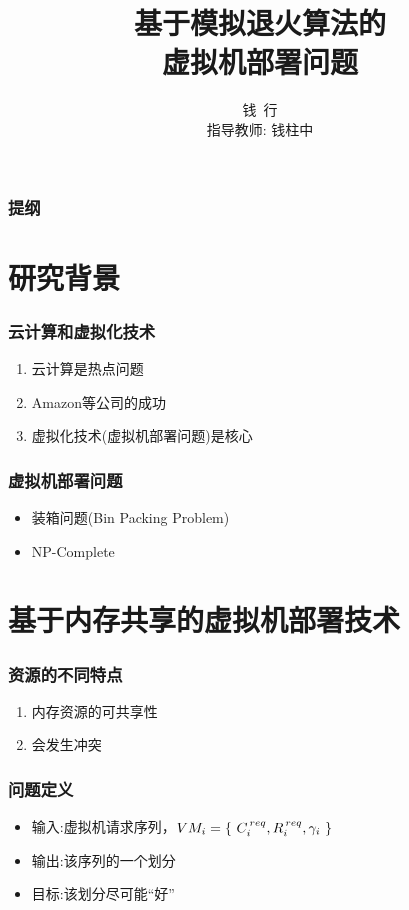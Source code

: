 \documentclass[slidestop,compress,mathserif,blue,12pt,adobefonts]{beamer}
\title{基于模拟退火算法的\\虚拟机部署问题}
\author{钱~行 \\ 指导教师: 钱柱中}
\institute{南京大学~~计算机科学与技术系}
\begin{document}
\begin{frame}
  \titlepage
\end{frame}

\begin{frame}
  \frametitle{提纲}
  \tableofcontents
\end{frame}

\section{研究背景}
\begin{frame}
  \frametitle{云计算和虚拟化技术}
  \begin{enumerate}
  \item<1-> 云计算是热点问题
  \item<2-> Amazon等公司的成功
  \item<3-> 虚拟化技术(虚拟机部署问题)是核心
  \end{enumerate}  
\end{frame}


\begin{frame}
  \frametitle{虚拟机部署问题}
  \begin{itemize}
  \item <1->装箱问题(Bin Packing Problem)
  \item <1- |alert@2>NP-Complete
  \end{itemize}
\end{frame}

\section{基于内存共享的虚拟机部署技术}
\begin{frame}
  \frametitle{资源的不同特点}
  \begin{enumerate}
  \item <1- |alert@1> 内存资源的可共享性
  \item 会发生冲突
  \end{enumerate}
\end{frame}

\begin{frame}
  \frametitle{问题定义}
  \begin{itemize}
  \item 输入:虚拟机请求序列，$VM_i = \{\ C^{\thinspace req}_i,R^{\thinspace req}_i,\gamma_i\ \}$
  \item 输出:该序列的一个划分
  \item 目标:该划分尽可能``好''
  \end{itemize}
\end{frame}
\end{document}
